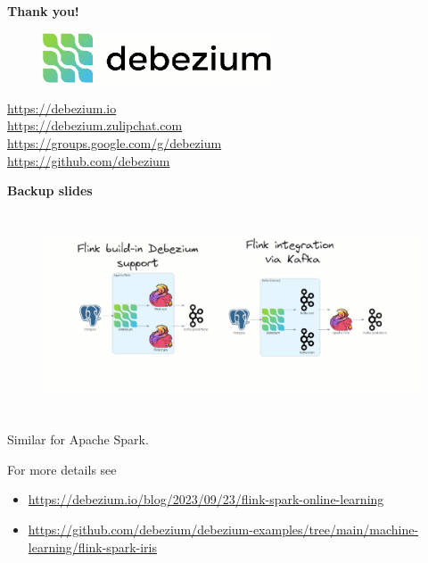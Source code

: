 \documentclass[10pt,utf8]{beamer}
\begin{document}
\begin{frame}
    \centering
    \textbf{\Huge{Thank you!}}
    
    \vspace{1cm}
    
    \begin{figure}
        \centering
        \includegraphics[height=1.5cm]{./img/debezium.eps}
    \end{figure}
    
    \vspace{0.5cm}
    
    \centering
    \color{blue}
    \url{https://debezium.io}\\
    \url{https://debezium.zulipchat.com}\\
    \url{https://groups.google.com/g/debezium}\\
    \url{https://github.com/debezium}\\
    \color{black}
\end{frame}


\begin{frame}
	\centering
	\huge{\textbf{Backup slides}}
\end{frame}

\begin{frame}
    \begin{figure}
        \hspace*{-1.1cm}
        \includegraphics[height=6cm]{./img/debezium_flink.eps}
    \end{figure}
    
    \vspace{-1cm}
    Similar for Apache Spark.
    \vspace{0.5cm}
    
    For more details see
    \begin{itemize}
        \item  \footnotesize \color{blue}\url{https://debezium.io/blog/2023/09/23/flink-spark-online-learning}
        \item  \footnotesize \url{https://github.com/debezium/debezium-examples/tree/main/machine-learning/flink-spark-iris}\color{black}
    \end{itemize}
\end{frame}
\end{document}
